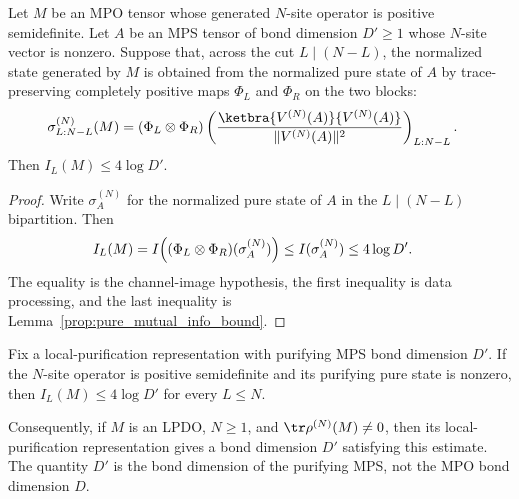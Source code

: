 \begin{lemma}
    \label{thm:local_channel_image_mutual_info_bound}
    \leanok
    Let $M$ be an MPO tensor whose generated $N$-site operator is positive
    semidefinite. Let $A$ be an MPS tensor of bond dimension $D'\geq1$ whose
    $N$-site vector is nonzero. Suppose that, across the cut $L\mid(N-L)$, the
    normalized state generated by $M$ is obtained from the normalized pure state
    of $A$ by trace-preserving completely positive maps $\Phi_L$ and $\Phi_R$ on
    the two blocks:
    \begin{align}
        \sigma^{(N)}_{L:N-L}(M)
         & =(\Phi_L\otimes\Phi_R)
        \left(\frac{\ketbra{V^{(N)}(A)}{V^{(N)}(A)}}
        {\lVert V^{(N)}(A)\rVert^2}\right)_{L:N-L}.
        \notag
    \end{align}
    Then $I_L(M)\leq4\log D'$.
\end{lemma}
\begin{proof}\leanok
    Write $\sigma_A^{(N)}$ for the normalized pure state of $A$ in the
    $L\mid(N-L)$ bipartition. Then
    \begin{align}
        I_L(M)
         & =I\!\left((\Phi_L\otimes\Phi_R)(\sigma_A^{(N)})\right)
        \leq I(\sigma_A^{(N)})
        \leq4\log D'.
        \notag
    \end{align}
    The equality is the channel-image hypothesis, the first inequality is data
    processing, and the last inequality is
    Lemma~\ref{prop:pure_mutual_info_bound}.
\end{proof}

\begin{lemma}
    \label{thm:lpdo_mutual_info_bound}
    \leanok
    Fix a local-purification representation with purifying MPS bond dimension
    $D'$. If the $N$-site operator is positive semidefinite and its purifying
    pure state is nonzero, then $I_L(M)\leq4\log D'$ for every $L\leq N$.

    Consequently, if $M$ is an LPDO, $N\geq1$, and
    $\tr\rho^{(N)}(M)\neq0$, then its local-purification representation
    gives a bond dimension $D'$ satisfying this estimate. The quantity
    $D'$ is the bond dimension of the purifying MPS, not the MPO bond
    dimension $D$.
\end{lemma}


